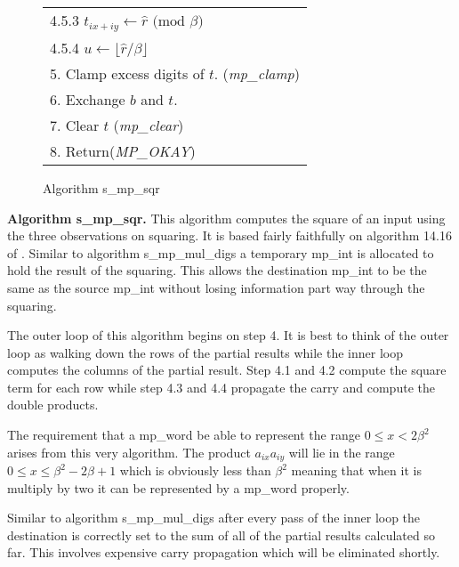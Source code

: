 \documentclass[b5paper]{book}
\begin{document}
\begin{figure}[!here]
\begin{small}
\begin{center}
\begin{tabular}{l}
\hspace{6mm}4.5.3  $t_{ix + iy} \leftarrow \hat r \mbox{ (mod }\beta\mbox{)}$ \\
\hspace{6mm}4.5.4  $u \leftarrow \lfloor \hat r / \beta \rfloor$ \\
5.  Clamp excess digits of $t$.  (\textit{mp\_clamp}) \\
6.  Exchange $b$ and $t$. \\
7.  Clear $t$ (\textit{mp\_clear}) \\
8.  Return(\textit{MP\_OKAY}) \\
\hline
\end{tabular}
\end{center}
\end{small}
\caption{Algorithm s\_mp\_sqr}
\end{figure}

\textbf{Algorithm s\_mp\_sqr.}
This algorithm computes the square of an input using the three observations on squaring.  It is based fairly faithfully on  algorithm 14.16 of 
\cite[pp.596-597]{HAC}.  Similar to algorithm s\_mp\_mul\_digs a temporary mp\_int is allocated to hold the result of the squaring.  This allows the 
destination mp\_int to be the same as the source mp\_int without losing information part way through the squaring.

The outer loop of this algorithm begins on step 4. It is best to think of the outer loop as walking down the rows of the partial results while
the inner loop computes the columns of the partial result.  Step 4.1 and 4.2 compute the square term for each row while step 4.3 and 4.4 propagate
the carry and compute the double products.  

The requirement that a mp\_word be able to represent the range $0 \le x < 2 \beta^2$ arises from this
very algorithm.  The product $a_{ix}a_{iy}$ will lie in the range $0 \le x \le \beta^2 - 2\beta + 1$ which is obviously less than $\beta^2$ meaning that
when it is multiply by two it can be represented by a mp\_word properly.

Similar to algorithm s\_mp\_mul\_digs after every pass of the inner loop the destination is correctly set to the sum of all of the partial 
results calculated so far.  This involves expensive carry propagation which will be eliminated shortly.  
\end{document}
